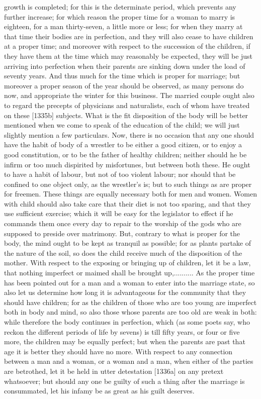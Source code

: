 growth is completed; for this is the determinate period, which prevents
any further increase; for which reason the proper time for a woman to
marry is eighteen, for a man thirty-seven, a little more or less; for when
they marry at that time their bodies are in perfection, and they will also
cease to have children at a proper time; and moreover with respect to the
succession of the children, if they have them at the time which may
reasonably be expected, they will be just arriving into perfection when
their parents are sinking down under the load of seventy years. And thus
much for the time which is proper for marriage; but moreover a proper
season of the year should be observed, as many persons do now, and
appropriate the winter for this business. The married couple ought also to
regard the precepts of physicians and naturalists, each of whom have
treated on these [1335b] subjects. What is the fit disposition of the body
will be better mentioned when we come to speak of the education of the
child; we will just slightly mention a few particulars. Now, there is no
occasion that any one should have the habit of body of a wrestler to be
either a good citizen, or to enjoy a good constitution, or to be the
father of healthy children; neither should he be infirm or too much
dispirited by misfortunes, but between both these. He ought to have a
habit of labour, but not of too violent labour; nor should that be
confined to one object only, as the wrestler's is; but to such things as
are proper for freemen. These things are equally necessary both for men
and women. Women with child should also take care that their diet is not
too sparing, and that they use sufficient exercise; which it will be easy
for the legislator to effect if he commands them once every day to repair
to the worship of the gods who are supposed to preside over matrimony.
But, contrary to what is proper for the body, the mind ought to be kept as
tranquil as possible; for as plants partake of the nature of the soil, so
does the child receive much of the disposition of the mother. With respect
to the exposing or bringing up of children, let it be a law, that nothing
imperfect or maimed shall be brought up,.......... As the proper time has
been pointed out for a man and a woman to enter into the marriage state,
so also let us determine how long it is advantageous for the community
that they should have children; for as the children of those who are too
young are imperfect both in body and mind, so also those whose parents are
too old are weak in both: while therefore the body continues in
perfection, which (as some poets say, who reckon the different periods of
life by sevens) is till fifty years, or four or five more, the children
may be equally perfect; but when the parents are past that age it is
better they should have no more. With respect to any connection between a
man and a woman, or a woman and a man, when either of the parties are
betrothed, let it be held in utter detestation [1336a] on any pretext
whatsoever; but should any one be guilty of such a thing after the
marriage is consummated, let his infamy be as great as his guilt deserves.

